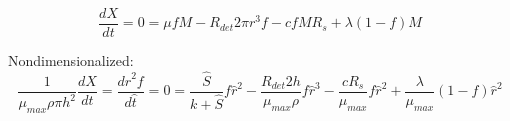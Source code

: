 \documentclass[11pt]{amsart}
\begin{document}
			\begin{equation}
				\frac{dX}{dt} = 0 = \mu fM - R_{det}2\pi r^3 f - cfMR_s + \lambda (1-f)M
				\label{hss:dXdt}
			\end{equation}

			Nondimensionalized:
			\begin{equation}
				\frac{1}{\mu_{max}\rho\pi h^2 }\frac{dX}{dt} = \frac{d\hat{r}^2f}{d\hat{t}} = 0
					= \frac{\hat{S}}{k+\hat{S}}f\hat{r}^2
						- \frac{R_{det}2 h}{\mu_{max}\rho}f\hat{r}^3
						- \frac{c R_s}{\mu_{max}}f\hat{r}^2
						+ \frac{\lambda}{\mu_{max}}(1-f)\hat{r}^2
				\label{hss:nd:dXdt}
			\end{equation}
			
\end{document}
